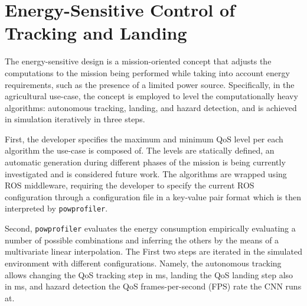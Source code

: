 \documentclass[conference]{IEEEtran}
\newcommand{\stt}[1]{{\small\tt #1}} %
\newcommand{\powprof}{\stt{powprofiler}}
\begin{document}
\section{Energy-Sensitive Control of Tracking and Landing}
\label{sec:approach}


The energy-sensitive design is a mission-oriented concept that adjusts the computations to the mission being performed while taking into account energy requirements, such as the presence of a limited power source. Specifically, in the agricultural use-case, the concept is employed to level the computationally heavy algorithms:  autonomous tracking, landing, and hazard detection, and is achieved in simulation iteratively in three steps. 

First, the developer specifies the maximum and minimum QoS level per each algorithm the use-case is composed of. The levels are statically defined, an automatic generation during different phases of the mission is being currently investigated and is considered future work. The algorithms are wrapped using ROS middleware, requiring the developer to specify the current ROS configuration through a configuration file in a key-value pair format which is then interpreted by \powprof{}.

Second, \powprof{} evaluates the energy consumption empirically evaluating a number of possible combinations and inferring the others by the means of a multivariate linear interpolation. The First two steps are iterated in the simulated environment with different configurations. 
Namely, the autonomous tracking allows changing the QoS tracking step in ms, landing the QoS landing step also in ms, and hazard detection the QoS frames-per-second (FPS) rate the CNN runs at.
\end{document}
